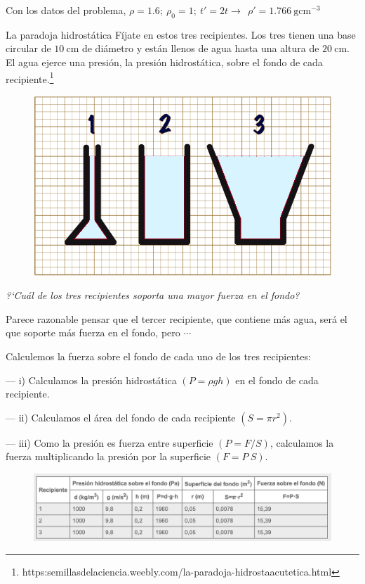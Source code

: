 Con los datos del problema, $\rho=1.6;\ \rho_0=1;\ t'=2t \to \ \ \rho'=1.766\ \mathrm{gcm}^{-3}$


\newpage %

\begin{myblock}{La paradoja hidrostática}
Fíjate en estos tres recipientes. Los tres tienen una base circular de $10\ \mathrm{cm}$ de diámetro y están llenos de agua hasta una altura de $20\ \mathrm{cm}$. El agua ejerce una presión, la presión hidrostática, sobre el fondo de cada recipiente.\footnote{https:semillasdelaciencia.weebly.com/la-paradoja-hidrostaacutetica.html}

\begin{figure}[H]
	\centering
	\includegraphics[width=.75\textwidth]{imagenes/imagenes07/T07IM24.png}
\end{figure}
	\emph{?`Cuál de los tres recipientes soporta una mayor fuerza en el fondo?}
	
	Parece razonable pensar que el tercer recipiente, que contiene más agua, será el que soporte más fuerza en el fondo, pero $\cdots$
	
	Calculemos la fuerza sobre el fondo de cada uno de los tres recipientes:

--- i) Calculamos la presión hidrostática $(P=\rho g h)$ en el fondo de cada recipiente.

--- ii) Calculamos el área del fondo de cada recipiente $(S=\pi r^2)$.

--- iii) Como la presión es fuerza entre superficie $(P=F/S)$, calculamos la fuerza multiplicando la presión por la superficie $(F=P\ S)$.
\begin{figure}[H]
	\centering
	\includegraphics[width=1\textwidth]{imagenes/imagenes07/T07IM25.png}
\end{figure}


\end{myblock}
